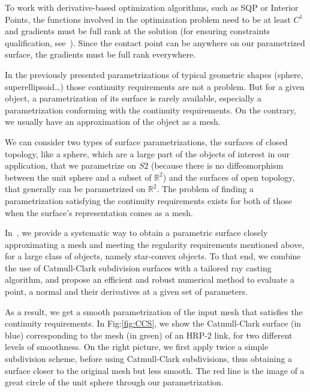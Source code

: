 To work with derivative-based optimization algorithms, such as SQP or Interior Points, the functions involved in the optimization problem need to be at least $C^1$ and gradients must be full rank at the solution (for ensuring constraints qualification, see~\cite{nocedal:book:2006}).
Since the contact point can be anywhere on our parametrized surface, the gradients must be full rank everywhere.

In the previously presented parametrizations of typical geometric shapes (sphere, superellipsoid\ldots) those continuity requirements are not a problem.
But for a given object, a parametrization of its surface is rarely available, especially a parametrization conforming with the continuity requirements.
On the contrary, we usually have an approximation of the object as a mesh.

We can consider two types of surface parametrizations, the surfaces of closed topology, like a sphere, which are a large part of the objects of interest in our application, that we parametrize on $S2$ (because there is no diffeomorphism between the unit sphere and a subset of $\mathbb{R}^2$) and the surfaces of open topology, that generally can be parametrized on $\mathbb{R}^2$.
The problem of finding a parametrization satisfying the continuity requirements exists for both of those when the surface's representation comes as a mesh.

In~\cite{escande:icra:2016}, we provide a systematic way to obtain a parametric surface closely approximating a mesh and meeting the regularity requirements mentioned above, for a large class of objects, namely star-convex objects.
To that end, we combine the use of Catmull-Clark subdivision surfaces with a tailored ray casting algorithm, and propose an efficient and robust numerical method to evaluate a point, a normal and their derivatives at a given set of parameters.

As a result, we get a smooth parametrization of the input mesh that satisfies the continuity requirements.
In Fig:\ref{fig:CCS}, we show the Catmull-Clark surface (in blue) corresponding to the mesh (in green) of an HRP-2 link, for two different levels of smoothness.
On the right picture, we first apply twice a simple subdivision scheme, before using Catmull-Clark subdivisions, thus obtaining a surface closer to the original mesh but less smooth.
The red line is the image of a great circle of the unit sphere through our parametrization.

